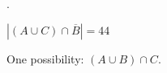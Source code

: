 \documentclass[11pt]{exam}
\def\bar{\overline}
\begin{document}
\begin{questions}
.

\question $|(A \cup C)\cap \bar B| = 44$


\question One possibility: $(A \cup B) \cap C$.



\end{questions}
\end{document}
